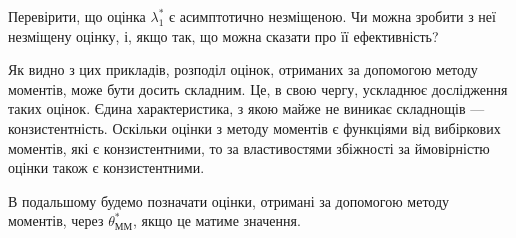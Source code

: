 \begin{exercise}
    Перевірити, що оцінка $\lambda_1^*$ є асимптотично незміщеною. Чи можна зробити з неї незміщену оцінку, і, якщо так, що можна сказати про її ефективність?
\end{exercise}
Як видно з цих прикладів, розподіл оцінок, отриманих за допомогою методу моментів, може бути досить складним. Це, в свою чергу, ускладнює дослідження таких оцінок.
Єдина характеристика, з якою майже не виникає складнощів --- конзистентність. Оскільки оцінки з методу моментів є функціями від вибіркових моментів, які є
конзистентними, то за властивостями збіжності за ймовірністю оцінки також є конзистентними.
\begin{remark}
    В подальшому будемо позначати оцінки, отримані за допомогою методу моментів, через $\theta^*_{\text{ММ}}$, якщо це матиме значення.
\end{remark}
